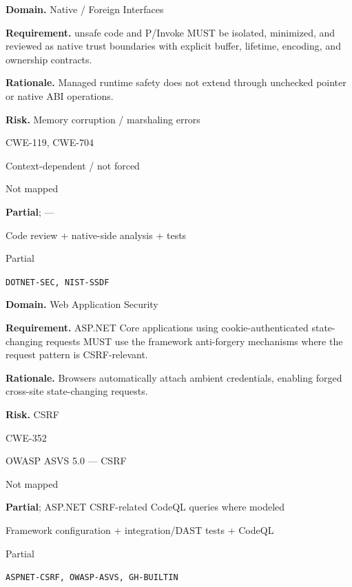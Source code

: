 \documentclass[10pt,letterpaper]{article}
\newcommand{\prioritybadge}[2]{\tcbox[on line,boxrule=0pt,arc=1.2mm,boxsep=0.7mm,left=1mm,right=1mm,top=0.4mm,bottom=0.4mm,colback=#2!12,coltext=#2]{\scriptsize\bfseries #1}}
\begin{document}
\begin{rulebox}[title={\texttt{SCS-CSHARP-FFI-001} \hfill \prioritybadge{Critical Control}{Critical}}]
\textbf{Domain.} Native / Foreign Interfaces

\textbf{Requirement.} unsafe code and P/Invoke MUST be isolated, minimized, and reviewed as native trust boundaries with explicit buffer, lifetime, encoding, and ownership contracts.

\textbf{Rationale.} Managed runtime safety does not extend through unchecked pointer or native ABI operations.

\textbf{Risk.} Memory corruption / marshaling errors

\begin{description}[leftmargin=2.65cm,labelwidth=2.3cm,style=nextline,itemsep=1pt,topsep=3pt]
  \item[CWE] CWE-119, CWE-704
  \item[OWASP] Context-dependent / not forced
  \item[CERT] Not mapped
  \item[CodeQL] \textbf{Partial}; ---
  \item[Enforcement] Code review + native-side analysis + tests
  \item[Automation] Partial
  \item[Sources] \texttt{DOTNET-SEC, NIST-SSDF}
\end{description}
\end{rulebox}

\begin{rulebox}[title={\texttt{SCS-CSHARP-WEB-001} \hfill \prioritybadge{Critical Control}{Critical}}]
\textbf{Domain.} Web Application Security

\textbf{Requirement.} ASP.NET Core applications using cookie-authenticated state-changing requests MUST use the framework anti-forgery mechanisms where the request pattern is CSRF-relevant.

\textbf{Rationale.} Browsers automatically attach ambient credentials, enabling forged cross-site state-changing requests.

\textbf{Risk.} CSRF

\begin{description}[leftmargin=2.65cm,labelwidth=2.3cm,style=nextline,itemsep=1pt,topsep=3pt]
  \item[CWE] CWE-352
  \item[OWASP] OWASP ASVS 5.0 --- CSRF
  \item[CERT] Not mapped
  \item[CodeQL] \textbf{Partial}; ASP.NET CSRF-related CodeQL queries where modeled
  \item[Enforcement] Framework configuration + integration/DAST tests + CodeQL
  \item[Automation] Partial
  \item[Sources] \texttt{ASPNET-CSRF, OWASP-ASVS, GH-BUILTIN}
\end{description}
\end{rulebox}
\end{document}
